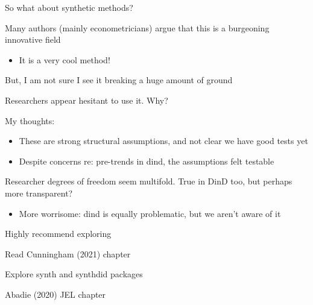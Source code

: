\documentclass[notes,11pt, aspectratio=169]{beamer}
\newenvironment{wideitemize}{\itemize\addtolength{\itemsep}{10pt}}{\enditemize}
\begin{document}
\begin{frame}{So what about synthetic methods?}
  \begin{wideitemize}
  \item Many authors (mainly econometricians) argue that this is a burgeoning innovative field
    \begin{itemize}
    \item It is a very cool method!
    \end{itemize}
  \item But, I am not sure I see it breaking a huge amount of ground
  \item Researchers appear hesitant to use it. Why?
  \item  My thoughts:
    \begin{itemize}
    \item These are strong structural assumptions, and not clear we
      have good tests yet
    \item Despite concerns re: pre-trends in dind, the assumptions
      felt testable
    \end{itemize}
  \item Researcher degrees of freedom seem multifold. True in DinD
    too, but perhaps more transparent?
    \begin{itemize}
    \item More worrisome: dind is equally problematic, but we aren't
      aware of it
    \end{itemize}
  \end{wideitemize}
\end{frame}

\begin{frame}{Highly recommend exploring}
  \begin{wideitemize}
  \item Read Cunningham (2021) chapter
  \item Explore synth and synthdid packages
  \item Abadie (2020) JEL chapter
  \end{wideitemize}
\end{frame}
\end{document}
